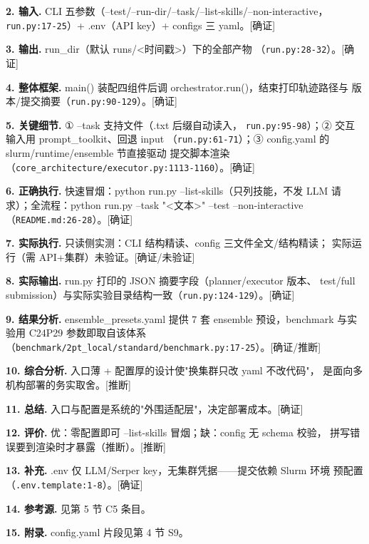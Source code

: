 \documentclass[UTF8]{ctexart}
\begin{document}
\noindent\textbf{2. 输入.} CLI 五参数（--test/--run-dir/--task/--list-skills/--non-interactive，
\texttt{\nolinkurl{run.py:17-25}}）+ .env（API key）+ configs 三 yaml。[确证]

\noindent\textbf{3. 输出.} run\_dir（默认 runs/<时间戳>）下的全部产物
（\texttt{\nolinkurl{run.py:28-32}}）。[确证]

\noindent\textbf{4. 整体框架.} main() 装配四组件后调 orchestrator.run()，结束打印轨迹路径与
版本/提交摘要（\texttt{\nolinkurl{run.py:90-129}}）。[确证]

\noindent\textbf{5. 关键细节.} ① --task 支持文件（.txt 后缀自动读入，
\texttt{\nolinkurl{run.py:95-98}}）；② 交互输入用 prompt\_toolkit、回退 input
（\texttt{\nolinkurl{run.py:61-71}}）；③ config.yaml 的 slurm/runtime/ensemble 节直接驱动
提交脚本渲染（\texttt{\nolinkurl{core_architecture/executor.py:1113-1160}}）。[确证]

\noindent\textbf{6. 正确执行.} 快速冒烟：python run.py --list-skills（只列技能，不发 LLM
请求）；全流程：python run.py --task "<文本>" --test --non-interactive
（\texttt{\nolinkurl{README.md:26-28}}）。[确证]

\noindent\textbf{7. 实际执行.} 只读侧实测：CLI 结构精读、config 三文件全文/结构精读；
实际运行（需 API+集群）\textcolor{warn}{未验证}。[确证/未验证]

\noindent\textbf{8. 实际输出.} run.py 打印的 JSON 摘要字段（planner/executor 版本、
test/full submission）与实际实验目录结构一致（\texttt{\nolinkurl{run.py:124-129}}）。[确证]

\noindent\textbf{9. 结果分析.} ensemble\_presets.yaml 提供 7 套 ensemble 预设，benchmark
与实验用 C24P29 参数即取自该体系（\texttt{\nolinkurl{benchmark/2pt_local/standard/benchmark.py:17-25}}）。[确证/推断]

\noindent\textbf{10. 综合分析.} 入口薄 + 配置厚的设计使"换集群只改 yaml 不改代码"，
是面向多机构部署的务实取舍。[推断]

\noindent\textbf{11. 总结.} 入口与配置是系统的"外围适配层"，决定部署成本。[确证]

\noindent\textbf{12. 评价.} 优：零配置即可 --list-skills 冒烟；缺：config 无 schema 校验，
拼写错误要到渲染时才暴露（推断）。[推断]

\noindent\textbf{13. 补充.} .env 仅 LLM/Serper key，无集群凭据——提交依赖 Slurm 环境
预配置（\texttt{\nolinkurl{.env.template:1-8}}）。[确证]

\noindent\textbf{14. 参考源.} 见第 5 节 C5 条目。

\noindent\textbf{15. 附录.} config.yaml 片段见第 4 节 S9。
\end{document}
